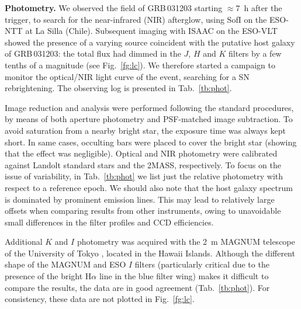 \documentclass{emulateapj}
\begin{document}
{\bf Photometry.} We observed the field of GRB\,031203 starting $\approx
7$~h after the trigger, to search for the near-infrared (NIR) afterglow,
using SofI on the ESO-NTT at La Silla (Chile). Subsequent imaging with
ISAAC on the ESO-VLT showed the presence of a varying source coincident
with the putative host galaxy of GRB\,031203: the total flux had dimmed
in the $J$, $H$ and $K$ filters by a few tenths of a magnitude (see
Fig.~\ref{fg:lc}). We therefore started a campaign to monitor the
optical/NIR light curve of the event, searching for a SN
rebrightening. The observing log is presented in Tab.~\ref{tb:phot}.

Image reduction and analysis were performed following the standard
procedures, by means of both aperture photometry and PSF-matched image
subtraction.  To avoid saturation from a nearby bright star, the
exposure time was always kept short. In same cases, occulting bars were
placed to cover the bright star (showing that the effect was
negligible). Optical and NIR photometry were calibrated against Landolt
standard stars and the 2MASS, respectively. To focus on the issue of
variability, in Tab.~\ref{tb:phot} we list just the relative photometry
with respect to a reference epoch. We should also note that the host
galaxy spectrum is dominated by prominent emission lines. This may lead
to relatively large offsets when comparing results from other
instruments, owing to unavoidable small differences in the filter
profiles and CCD efficiencies.

Additional $K$ and $I$ photometry was acquired with the 2~m MAGNUM
telescope of the University of Tokyo \citep{Yo03}, located in the Hawaii
Islands. Although the different shape of the MAGNUM and ESO $I$ filters
(particularly critical due to the presence of the bright H$\alpha$ line
in the blue filter wing) makes it difficult to compare the results, the
data are in good agreement (Tab.~\ref{tb:phot}). For consistency, these
data are not plotted in Fig.~\ref{fg:lc}.
\end{document}
